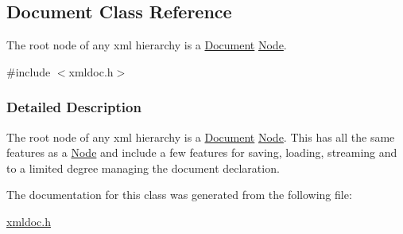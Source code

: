 \hypertarget{classDocument}{
\subsection{Document Class Reference}
\label{classDocument}
}


The root node of any xml hierarchy is a \hyperlink{classDocument}{Document} \hyperlink{classNode}{Node}.  




{\ttfamily \#include $<$xmldoc.h$>$}



\subsubsection{Detailed Description}
The root node of any xml hierarchy is a \hyperlink{classDocument}{Document} \hyperlink{classNode}{Node}. This has all the same features as a \hyperlink{classNode}{Node} and include a few features for saving, loading, streaming and to a limited degree managing the document declaration. 

The documentation for this class was generated from the following file:\begin{DoxyCompactItemize}
\item 
\hyperlink{xmldoc_8h}{xmldoc.h}\end{DoxyCompactItemize}
